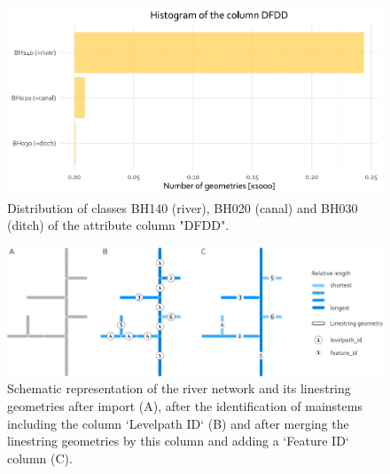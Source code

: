 \documentclass[fleqn,10pt]{wlscirep}
\begin{document}
\normalsize

\footnotesize

\begin{figure}[H]

{\centering \includegraphics[width=0.8\linewidth]{data_descriptor/tex/figure-dfddstatsbarplot-1} 

}

\caption{Distribution of classes BH140 (river), BH020 (canal) and BH030 (ditch) of the attribute column "DFDD".}\label{fig:dfddstatsbarplot}
\end{figure}

\normalsize

\footnotesize

\begin{figure}[H]

{\centering \includegraphics[width=1\linewidth]{data_descriptor/tex/mainstem_scheme} 

}

\caption{Schematic representation of the river network and its linestring geometries after import (A), after the identification of mainstems including the column `Levelpath ID` (B) and after merging the linestring geometries by this column and adding a `Feature ID` column (C).}\label{fig:mainstemscheme}
\end{figure}

\normalsize

\footnotesize
\end{document}
